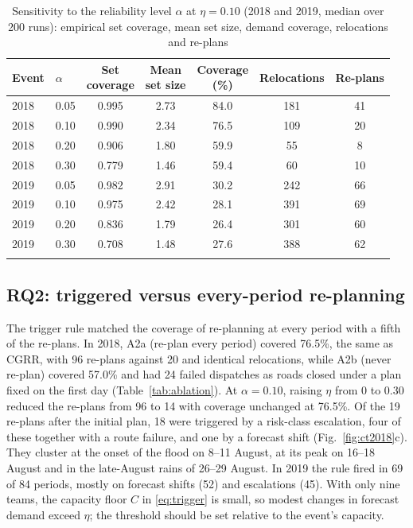 \documentclass[pdflatex,sn-basic]{sn-jnl}
\theoremstyle{plain}%
\theoremstyle{remark}%
\theoremstyle{definition}%
\begin{document}
\begin{table}[h]
\caption{Sensitivity to the reliability level $\alpha$ at $\eta = 0.10$ (2018 and 2019, median over 200 runs): empirical set coverage, mean set size, demand coverage, relocations and re-plans}\label{tab:alpha}
\footnotesize
\begin{tabular*}{\textwidth}{@{\extracolsep\fill}llccccc}
\toprule
Event & $\alpha$ & \makecell{Set\\coverage} & \makecell{Mean\\set size} & \makecell{Coverage\\(\%)} & Relocations & Re-plans \\
\midrule
2018 & 0.05 & 0.995 & 2.73 & 84.0 & 181 & 41 \\
2018 & 0.10 & 0.990 & 2.34 & 76.5 & 109 & 20 \\
2018 & 0.20 & 0.906 & 1.80 & 59.9 & 55 & 8 \\
2018 & 0.30 & 0.779 & 1.46 & 59.4 & 60 & 10 \\
2019 & 0.05 & 0.982 & 2.91 & 30.2 & 242 & 66 \\
2019 & 0.10 & 0.975 & 2.42 & 28.1 & 391 & 69 \\
2019 & 0.20 & 0.836 & 1.79 & 26.4 & 301 & 60 \\
2019 & 0.30 & 0.708 & 1.48 & 27.6 & 388 & 62 \\
\botrule
\end{tabular*}
\end{table}

\subsection{RQ2: triggered versus every-period re-planning}

The trigger rule matched the coverage of re-planning at every period with a fifth of the re-plans. In 2018, A2a (re-plan every period) covered 76.5\%, the same as CGRR, with 96 re-plans against 20 and identical relocations, while A2b (never re-plan) covered 57.0\% and had 24 failed dispatches as roads closed under a plan fixed on the first day (Table~\ref{tab:ablation}). At $\alpha = 0.10$, raising $\eta$ from 0 to 0.30 reduced the re-plans from 96 to 14 with coverage unchanged at 76.5\%. Of the 19 re-plans after the initial plan, 18 were triggered by a risk-class escalation, four of these together with a route failure, and one by a forecast shift (Fig.~\ref{fig:ct2018}c). They cluster at the onset of the flood on 8--11 August, at its peak on 16--18 August and in the late-August rains of 26--29 August. In 2019 the rule fired in 69 of 84 periods, mostly on forecast shifts (52) and escalations (45). With only nine teams, the capacity floor $C$ in \eqref{eq:trigger} is small, so modest changes in forecast demand exceed $\eta$; the threshold should be set relative to the event's capacity.
\end{document}
